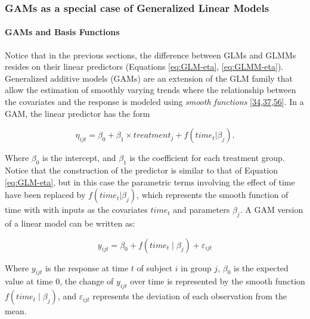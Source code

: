 \documentclass[
]{article}
\begin{document}
\hypertarget{GAM-theory}{%
\subsubsection{GAMs as a special case of Generalized Linear Models}\label{GAM-theory}}

\hypertarget{gams-and-basis-functions}{%
\paragraph{GAMs and Basis Functions}\label{gams-and-basis-functions}}

Notice that in the previous sections, the difference between GLMs and GLMMs resides on their linear predictors (Equations \eqref{eq:GLM-eta}, \eqref{eq:GLMM-eta}). Generalized additive models (GAMs) are an extension of the GLM family that allow the estimation of smoothly varying trends where the relationship between the covariates and the response is modeled using \emph{smooth functions} {[}\protect\hyperlink{ref-simpson2018}{34},\protect\hyperlink{ref-wood2017}{37},\protect\hyperlink{ref-hastie1987}{56}{]}. In a GAM, the linear predictor has the form

\begin{equation}
\eta_{ijt}=\beta_{0}+ \beta_{1} \times treatment_{j} +f(time_{t}|\beta_{j}).
\label{eq:GAM-eta}
\end{equation}

Where \(\beta_{0}\) is the intercept, and \(\beta_{1}\) is the coefficient for each treatment group. Notice that the construction of the predictor is similar to that of Equation \eqref{eq:GLM-eta}, but in this case the parametric terms involving the effect of time have been replaced by \(f(time_{t}|\beta_{j})\), which represents the smooth function of time with with inputs as the covariates \(time_t\) and parameters \(\beta_{j}\). A GAM version of a linear model can be written as:

\begin{equation}
  y_{ijt}=\beta_0+f(time_t\mid \beta_j)+\varepsilon_{ijt}
  \label{eq:GAM}
\end{equation}

Where \(y_{ijt}\) is the response at time \(t\) of subject \(i\) in group \(j\), \(\beta_0\) is the expected value at time 0, the change of \(y_{ijt}\) over time is represented by the smooth function \(f(time_t\mid \beta_j)\), and \(\varepsilon_{ijt}\) represents the deviation of each observation from the mean.
\end{document}
